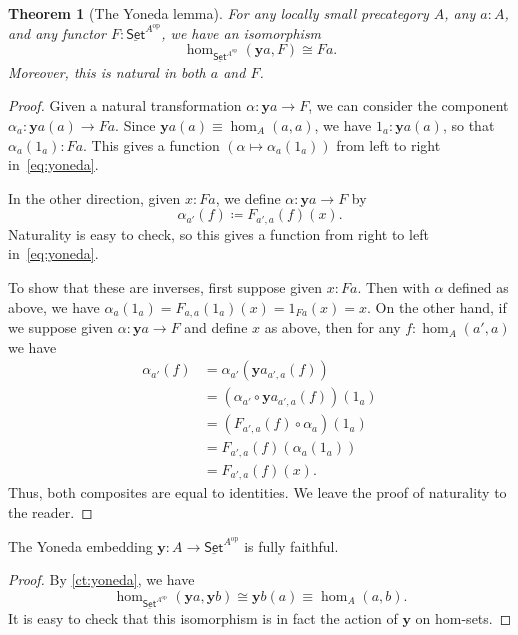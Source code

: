 \documentclass{amsart}
\newcommand{\jdeq}{\equiv}      %
\newcommand{\defeq}{\coloneqq}  %
\renewcommand{\set}{\ensuremath{\mathsf{Set}}\xspace}
\newcommand{\uset}{\ensuremath{\underline{\set}}\xspace}
\newtheorem{thm}{Theorem}[section]
\theoremstyle{definition}
\theoremstyle{remark}
\numberwithin{equation}{section}
\newcommand{\op}{^{\textrm{op}}}
\newcommand{\y}{\ensuremath{\mathbf{y}}\xspace}
\begin{document}
\begin{thm}[The Yoneda lemma]\label{ct:yoneda}
  For any locally small precategory $A$, any $a:A$, and any functor $F:\uset^{A\op}$, we have an isomorphism
  \begin{equation}\label{eq:yoneda}
    \hom_{\uset^{A\op}}(\y a, F) \cong Fa.
  \end{equation}
  Moreover, this is natural in both $a$ and $F$.
\end{thm}
\begin{proof}
  Given a natural transformation $\alpha:\y a \to F$, we can consider the component $\alpha_a : \y a(a) \to F a$.
  Since $\y a(a)\jdeq \hom_A(a,a)$, we have $1_a : \y a(a)$, so that $\alpha_a(1_a) : F a$.
  This gives a function $(\alpha \mapsto \alpha_a(1_a))$ from left to right in~\eqref{eq:yoneda}.

  In the other direction, given $x:F a$, we define $\alpha:\y a \to F$ by
  \[\alpha_{a'}(f) \defeq F_{a',a}(f)(x). \]
  Naturality is easy to check, so this gives a function from right to left in~\eqref{eq:yoneda}.

  To show that these are inverses, first suppose given $x:F a$.
  Then with $\alpha$ defined as above, we have $\alpha_a(1_a) = F_{a,a}(1_a)(x) = 1_{F a}(x) = x$.
  On the other hand, if we suppose given $\alpha:\y a \to F$ and define $x$ as above, then for any $f:\hom_A(a',a)$ we have
  \begin{align*}
    \alpha_{a'}(f)
    &= \alpha_{a'} (\y a_{a',a}(f))\\
    &= (\alpha_{a'}\circ \y a_{a',a}(f))(1_a)\\
    &= (F_{a',a}(f)\circ \alpha_a)(1_a)\\
    &= F_{a',a}(f)(\alpha_a(1_a))\\
    &= F_{a',a}(f)(x).
  \end{align*}
  Thus, both composites are equal to identities.
  We leave the proof of naturality to the reader.
\end{proof}

\begin{cor}\label{ct:yoneda-embedding}
  The Yoneda embedding $\y :A\to \uset^{A\op}$ is fully faithful.
\end{cor}
\begin{proof}
  By \autoref{ct:yoneda}, we have
  \[ \hom_{\uset^{A\op}}(\y a, \y b) \cong \y b(a) \jdeq \hom_A(a,b). \]
  It is easy to check that this isomorphism is in fact the action of \y on hom-sets.
\end{proof}
\end{document}
